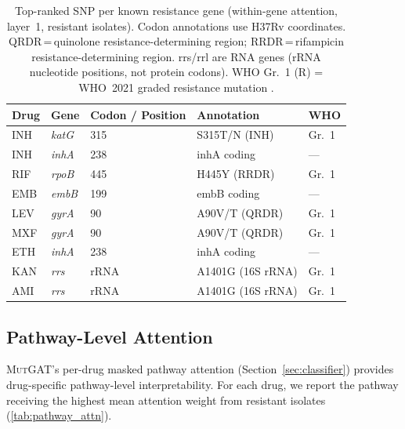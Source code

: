 \documentclass{article}
\theoremstyle{plain}
\theoremstyle{definition}
\theoremstyle{remark}
\begin{document}
\begin{table}[t]
\caption{Top-ranked SNP per known resistance gene (within-gene attention, layer~1, resistant isolates). Codon annotations use H37Rv coordinates. QRDR\,=\,quinolone resistance-determining region; RRDR\,=\,rifampicin resistance-determining region. rrs/rrl are RNA genes (rRNA nucleotide positions, not protein codons). WHO Gr.~1 (R) = WHO~2021 graded resistance mutation \citep{walker2022who}.}
\label{tab:snp_attn}
\vskip 0.1in
\begin{center}
\begin{small}
\begin{tabular}{lllll}
\toprule
Drug & Gene & Codon / Position & Annotation & WHO \\
\midrule
INH  & \textit{katG}  & 315     & S315T/N (INH)        & Gr.~1 \\
INH  & \textit{inhA}  & 238     & inhA coding          & ---   \\
RIF  & \textit{rpoB}  & 445     & H445Y (RRDR)         & Gr.~1 \\
EMB  & \textit{embB}  & 199     & embB coding          & ---   \\
LEV  & \textit{gyrA}  & 90      & A90V/T (QRDR)        & Gr.~1 \\
MXF  & \textit{gyrA}  & 90      & A90V/T (QRDR)        & Gr.~1 \\
ETH  & \textit{inhA}  & 238     & inhA coding          & ---   \\
KAN  & \textit{rrs}   & rRNA    & A1401G (16S rRNA)    & Gr.~1 \\
AMI  & \textit{rrs}   & rRNA    & A1401G (16S rRNA)    & Gr.~1 \\
\bottomrule
\end{tabular}
\end{small}
\end{center}
\vskip -0.1in
\end{table}

\subsection{Pathway-Level Attention}
\label{sec:pathway_analysis}

\textsc{MutGAT}'s per-drug masked pathway attention (Section~\ref{sec:classifier}) provides drug-specific pathway-level interpretability. For each drug, we report the pathway receiving the highest mean attention weight from resistant isolates (\cref{tab:pathway_attn}).
\end{document}
